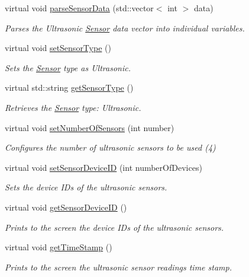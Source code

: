 \begin{DoxyCompactItemize}
virtual void \hyperlink{classUltrasonicSensor_ac24cc66755a3201fc667e43d7d0a62c5}{parse\-Sensor\-Data} (std\-::vector$<$ int $>$ data)
\begin{DoxyCompactList}\small\item\em Parses the Ultrasonic \hyperlink{classSensor}{Sensor} data vector into individual variables. \end{DoxyCompactList}\item 
virtual void \hyperlink{classUltrasonicSensor_a0f3de9fee2a0ff99f5163b778ecfad4d}{set\-Sensor\-Type} ()
\begin{DoxyCompactList}\small\item\em Sets the \hyperlink{classSensor}{Sensor} type as Ultrasonic. \end{DoxyCompactList}\item 
virtual std\-::string \hyperlink{classUltrasonicSensor_ac354871be24914dfbfad3f07af061403}{get\-Sensor\-Type} ()
\begin{DoxyCompactList}\small\item\em Retrieves the \hyperlink{classSensor}{Sensor} type\-: Ultrasonic. \end{DoxyCompactList}\item 
virtual void \hyperlink{classUltrasonicSensor_adbd980ad9471ccf285dede0c4a4c4def}{set\-Number\-Of\-Sensors} (int number)
\begin{DoxyCompactList}\small\item\em Configures the number of ultrasonic sensors to be used (4) \end{DoxyCompactList}\item 
virtual void \hyperlink{classUltrasonicSensor_a9c92da2614f15035c069c7ae9ae2899d}{set\-Sensor\-Device\-I\-D} (int number\-Of\-Devices)
\begin{DoxyCompactList}\small\item\em Sets the device I\-Ds of the ultrasonic sensors. \end{DoxyCompactList}\item 
virtual void \hyperlink{classUltrasonicSensor_a1676043861eb34cb61e27002212b90cc}{get\-Sensor\-Device\-I\-D} ()
\begin{DoxyCompactList}\small\item\em Prints to the screen the device I\-Ds of the ultrasonic sensors. \end{DoxyCompactList}\item 
virtual void \hyperlink{classUltrasonicSensor_ac101ee85a4d58f5bf075e18ece5776da}{get\-Time\-Stamp} ()
\begin{DoxyCompactList}\small\item\em Prints to the screen the ultrasonic sensor readings time stamp. \end{DoxyCompactList}\end{DoxyCompactItemize}


